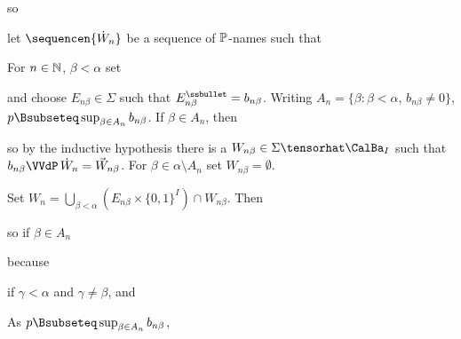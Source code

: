 {\noindent so


\noindent let $\sequencen{\dot W_n}$ be a sequence of $\Bbb P$-names
such that


\noindent For $n\in\Bbb N$, $\beta<\alpha$ set


\noindent and choose $E_{n\beta}\in\Sigma$ such that
$E_{n\beta}^{\ssbullet}=b_{n\beta}$.
Writing $A_n=\{\beta:\beta<\alpha$, $b_{n\beta}\ne 0\}$,
$p\Bsubseteq\sup_{\beta\in A_n}b_{n\beta}$.  If $\beta\in A_n$, then


\noindent so by the inductive hypothesis there is a
$W_{n\beta}\in\Sigma\tensorhat\CalBa_I$ such that
$b_{n\beta}\VVdP\,\dot W_n=\vec W_{n\beta}$.   For
$\beta\in\alpha\setminus A_n$ set $W_{n\beta}=\emptyset$.

Set $W_n=\bigcup_{\beta<\alpha}(E_{n\beta}\times\{0,1\}^I)\cap W_{n\beta}$.
Then


\noindent so if $\beta\in A_n$


\noindent because


\noindent if $\gamma<\alpha$ and $\gamma\ne\beta$, and


\noindent As $p\Bsubseteq\sup_{\beta\in A_n}b_{n\beta}$,


}
